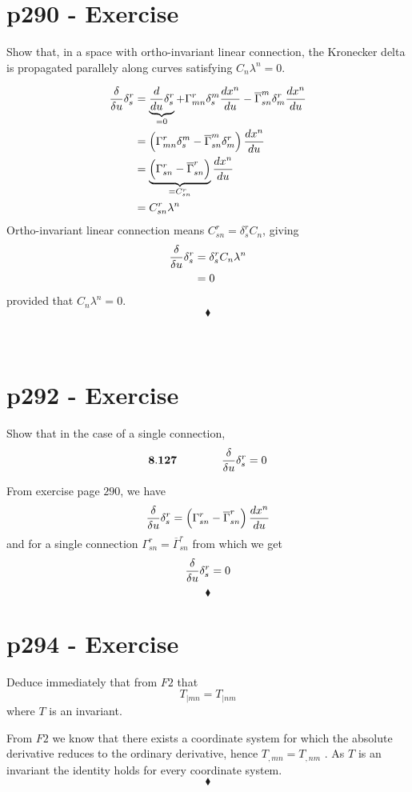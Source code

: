 \section{p290 - Exercise}
\begin{tcolorbox}
Show that, in a space with ortho-invariant linear connection, the Kronecker delta is propagated parallely along curves satisfying $C_n\lambda^n = 0$.
\end{tcolorbox}
 \begin{align}
 \fdv{}{u}\delta^r_s &= \underbrace{\dv{}{u}\delta^r_s}_{=0}+\Gamma^r_{mn}\delta^m_s\dv{x^n}{u} - \overline{\Gamma}^m_{sn}\delta^r_m\dv{x^n}{u} \\
 &= \left(\Gamma^r_{mn}\delta^m_s - \overline{\Gamma}^m_{sn}\delta^r_m\right)\dv{x^n}{u} \\
 &=\underbrace{ \left(\Gamma^r_{sn} - \overline{\Gamma}^r_{sn}\right)}_{=C^r_{sn}}\dv{x^n}{u}\\
 &=C^r_{sn}\lambda^n 
 \end{align}
 Ortho-invariant linear connection means $C^r_{sn}=\delta^r_s C_n$, giving
  \begin{align}
 \fdv{}{u}\delta^r_s &= \delta^r_s C_n\lambda^n \\
 &=0
 \end{align}
 provided that $C_n\lambda^n = 0$.
$$\blacklozenge$$\\\\



\section{p292 - Exercise}
\begin{tcolorbox}
Show that in the case of a single connection,
$$\mathbf{8.127}  \spatie \fdv{}{u}\delta^r_s =0$$
\end{tcolorbox}
 From exercise page $290$, we have
 $$\fdv{}{u}\delta^r_s =  \left(\Gamma^r_{sn} - \overline{\Gamma}^r_{sn}\right)\dv{x^n}{u}$$ and for a single connection $\Gamma^r_{sn} = \overline{\Gamma}^r_{sn}$ from which we get
 $$\fdv{}{u}\delta^r_s =  0$$
$$\blacklozenge$$
\newpage



\section{p294 - Exercise}
\begin{tcolorbox}
Deduce immediately that from $F2$ that
$$T_{|mn}= T_{|nm}$$ where $T$ is an invariant.
\end{tcolorbox}
 From $F2$ we know that there exists a coordinate system for which the absolute derivative reduces to the ordinary derivative, hence $T_{,mn}= T_{,nm}$ . As $T$ is an invariant the identity holds for every coordinate system.
$$\blacklozenge$$\\

